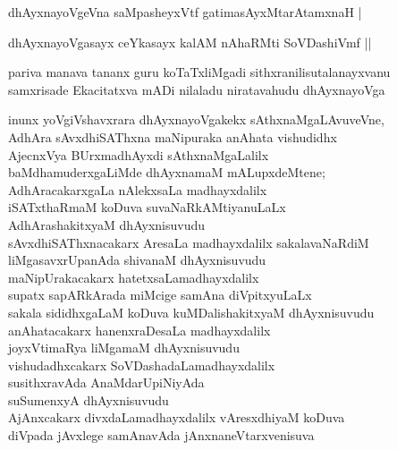\begin{entry}
\begin{shl}
dhAyxnayoVgeVna saMpasheyxVtf gatimasAyxMtarAtamxnaH |
\end{shl}
\begin{shl}
dhAyxnayoVgasayx ceYkasayx kalAM nAhaRMti SoVDashiVmf ||
\end{shl}

\begin{shl}
pariva manava tananx guru koTaTxliMgadi sithxranilisutalanayxvanu\\
samxrisade Ekacitatxva mADi nilaladu niratavahudu dhAyxnayoVga
\end{shl}
\begin{shl}
inunx yoVgiVshavxrara dhAyxnayoVgakekx sAthxnaMgaLAvuveVne,\\
AdhAra sAvxdhiSAThxna maNipuraka anAhata vishudidhx\\
AjecnxVya BUrxmadhAyxdi sAthxnaMgaLalilx\\
baMdhamuderxgaLiMde dhAyxnamaM mALupxdeMtene;\\
AdhAracakarxgaLa nAlekxsaLa madhayxdalilx\\
iSATxthaRmaM koDuva suvaNaRkAMtiyanuLaLx\\
AdhArashakitxyaM dhAyxnisuvudu\\
sAvxdhiSAThxnacakarx AresaLa madhayxdalilx sakalavaNaRdiM\\
liMgasavxrUpanAda shivanaM dhAyxnisuvudu\\
maNipUrakacakarx hatetxsaLamadhayxdalilx\\
supatx sapARkArada miMcige samAna diVpitxyuLaLx\\
sakala sididhxgaLaM koDuva kuMDalishakitxyaM dhAyxnisuvudu\\
anAhatacakarx hanenxraDesaLa madhayxdalilx\\
joyxVtimaRya liMgamaM dhAyxnisuvudu\\
vishudadhxcakarx SoVDashadaLamadhayxdalilx\\
susithxravAda AnaMdarUpiNiyAda\\
suSumenxyA dhAyxnisuvudu\\
AjAnxcakarx divxdaLamadhayxdalilx vAresxdhiyaM koDuva\\
diVpada jAvxlege samAnavAda jAnxnaneVtarxvenisuva\\

\end{shl}
\end{entry}

